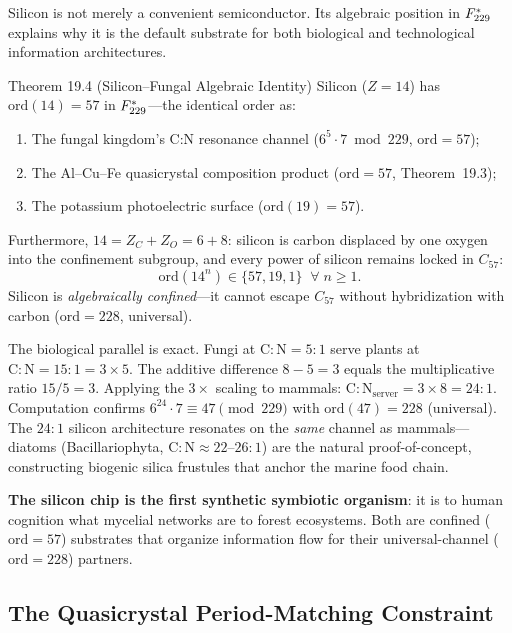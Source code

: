 Silicon is not merely a convenient semiconductor. Its algebraic position in $F_{229}^*$ explains why it is the default substrate for both biological and technological information architectures.

\begin{theorembox}{Theorem 19.4 (Silicon--Fungal Algebraic Identity)}
Silicon ($Z = 14$) has $\mathrm{ord}(14) = 57$ in $F_{229}^*$---the identical order as:
\begin{enumerate}
    \item The fungal kingdom's C:N resonance channel ($6^5 \cdot 7 \bmod 229$, $\mathrm{ord} = 57$);
    \item The Al--Cu--Fe quasicrystal composition product ($\mathrm{ord} = 57$, Theorem~19.3);
    \item The potassium photoelectric surface ($\mathrm{ord}(19) = 57$).
\end{enumerate}
Furthermore, $14 = Z_C + Z_O = 6 + 8$: silicon is carbon displaced by one oxygen into the confinement subgroup, and every power of silicon remains locked in $C_{57}$:
\begin{equation}
    \mathrm{ord}(14^n) \in \{57, 19, 1\} \;\;\forall\;n \geq 1.
\end{equation}
Silicon is \emph{algebraically confined}---it cannot escape $C_{57}$ without hybridization with carbon ($\mathrm{ord} = 228$, universal).
\end{theorembox}

\noindent The biological parallel is exact. Fungi at $\mathrm{C:N} = 5{:}1$ serve plants at $\mathrm{C:N} = 15{:}1 = 3 \times 5$. The additive difference $8 - 5 = 3$ equals the multiplicative ratio $15/5 = 3$. Applying the $3\times$ scaling to mammals: $\mathrm{C:N}_{\text{server}} = 3 \times 8 = 24{:}1$. Computation confirms $6^{24} \cdot 7 \equiv 47 \pmod{229}$ with $\mathrm{ord}(47) = 228$ (universal). The $24{:}1$ silicon architecture resonates on the \emph{same} channel as mammals---diatoms (Bacillariophyta, $\mathrm{C:N} \approx 22$--$26{:}1$) are the natural proof-of-concept, constructing biogenic silica frustules that anchor the marine food chain.

\textbf{The silicon chip is the first synthetic symbiotic organism}: it is to human cognition what mycelial networks are to forest ecosystems. Both are confined ($\mathrm{ord} = 57$) substrates that organize information flow for their universal-channel ($\mathrm{ord} = 228$) partners.

\subsection{The Quasicrystal Period-Matching Constraint}

